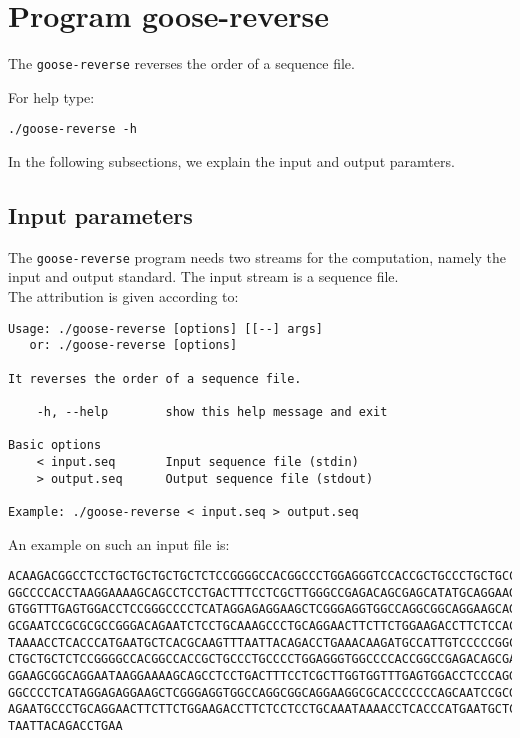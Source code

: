 \section{Program goose-reverse}
The \texttt{goose-reverse} reverses the order of a sequence file.

For help type:
\begin{lstlisting}
./goose-reverse -h
\end{lstlisting}
In the following subsections, we explain the input and output paramters.

\subsection*{Input parameters}

The \texttt{goose-reverse} program needs two streams for the computation,
namely the input and output standard. The input stream is a sequence file.\\
The attribution is given according to:
\begin{lstlisting}
Usage: ./goose-reverse [options] [[--] args]
   or: ./goose-reverse [options]

It reverses the order of a sequence file.

    -h, --help        show this help message and exit

Basic options
    < input.seq       Input sequence file (stdin)
    > output.seq      Output sequence file (stdout)

Example: ./goose-reverse < input.seq > output.seq
\end{lstlisting}
An example on such an input file is:
\begin{lstlisting}
ACAAGACGGCCTCCTGCTGCTGCTGCTCTCCGGGGCCACGGCCCTGGAGGGTCCACCGCTGCCCTGCTGCCATTGTCCCC
GGCCCCACCTAAGGAAAAGCAGCCTCCTGACTTTCCTCGCTTGGGCCGAGACAGCGAGCATATGCAGGAAGCGGCAGGAA
GTGGTTTGAGTGGACCTCCGGGCCCCTCATAGGAGAGGAAGCTCGGGAGGTGGCCAGGCGGCAGGAAGCAGGCCAGTGCC
GCGAATCCGCGCGCCGGGACAGAATCTCCTGCAAAGCCCTGCAGGAACTTCTTCTGGAAGACCTTCTCCACCCCCCCAGC
TAAAACCTCACCCATGAATGCTCACGCAAGTTTAATTACAGACCTGAAACAAGATGCCATTGTCCCCCGGCCTCCTGCTG
CTGCTGCTCTCCGGGGCCACGGCCACCGCTGCCCTGCCCCTGGAGGGTGGCCCCACCGGCCGAGACAGCGAGCATATGCA
GGAAGCGGCAGGAATAAGGAAAAGCAGCCTCCTGACTTTCCTCGCTTGGTGGTTTGAGTGGACCTCCCAGGCCAGTGCCG
GGCCCCTCATAGGAGAGGAAGCTCGGGAGGTGGCCAGGCGGCAGGAAGGCGCACCCCCCCAGCAATCCGCGCGCCGGGAC
AGAATGCCCTGCAGGAACTTCTTCTGGAAGACCTTCTCCTCCTGCAAATAAAACCTCACCCATGAATGCTCACGCAAGTT
TAATTACAGACCTGAA
\end{lstlisting}

